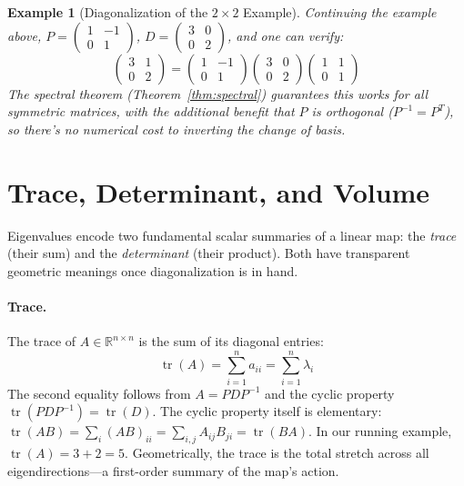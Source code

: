 \documentclass[12pt,a4paper]{report}
\DeclareMathOperator{\tr}{tr}
\theoremstyle{thms}
\theoremstyle{defns}
\newtheorem{example}{Example}[section]
\begin{document}
\begin{example}[Diagonalization of the $2 \times 2$ Example]
    Continuing the example above, $P = \begin{pmatrix} 1 & -1 \\ 0 & 1 \end{pmatrix}$, $D = \begin{pmatrix} 3 & 0 \\ 0 & 2 \end{pmatrix}$, and one can verify:
    \begin{equation}
        \begin{pmatrix} 3 & 1 \\ 0 & 2 \end{pmatrix} = \begin{pmatrix} 1 & -1 \\ 0 & 1 \end{pmatrix}\begin{pmatrix} 3 & 0 \\ 0 & 2 \end{pmatrix}\begin{pmatrix} 1 & 1 \\ 0 & 1 \end{pmatrix}
    \end{equation}
    The spectral theorem (Theorem~\ref{thm:spectral}) guarantees this works for all symmetric matrices, with the additional benefit that $P$ is orthogonal ($P^{-1} = P^T$), so there's no numerical cost to inverting the change of basis.
\end{example}

\section{Trace, Determinant, and Volume}
\label{sec:trace_det_volume}

Eigenvalues encode two fundamental scalar summaries of a linear map: the \textit{trace} (their sum) and the \textit{determinant} (their product). Both have transparent geometric meanings once diagonalization is in hand.

\paragraph{Trace.} The trace of $A \in \mathbb{R}^{n \times n}$ is the sum of its diagonal entries:
\begin{equation}
    \tr(A) = \sum_{i=1}^{n} a_{ii} = \sum_{i=1}^{n} \lambda_i
\end{equation}
The second equality follows from $A = PDP^{-1}$ and the cyclic property $\tr(PDP^{-1}) = \tr(D)$. The cyclic property itself is elementary: $\tr(AB) = \sum_i (AB)_{ii} = \sum_{i,j} A_{ij}B_{ji} = \tr(BA)$. In our running example, $\tr(A) = 3 + 2 = 5$. Geometrically, the trace is the total stretch across all eigendirections—a first-order summary of the map's action.
\end{document}
